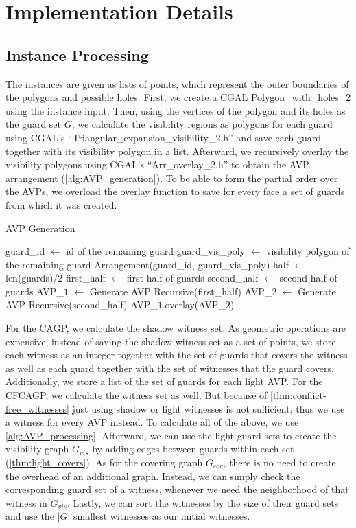 \chapter{Implementation Details}

\section{Instance Processing}
The instances are given as lists of points, which represent the outer boundaries of the polygons and possible holes. First, we create a CGAL Polygon\_with\_holes\_2 using the instance input. Then, using the vertices of the polygon and its holes as the guard set $G$, we calculate the visibility regions as polygons for each guard using CGAL's ``Triangular\_expansion\_visibility\_2.h'' and save each guard together with its visibility polygon in a list. Afterward, we recursively overlay the visibility polygons using CGAL's ``Arr\_overlay\_2.h'' to obtain the AVP arrangement (\cref{alg:AVP_generation}). To be able to form the partial order over the AVPs, we overload the overlay function to save for every face a set of guards from which it was created. 

\begin{algorithm}
\caption{AVP Generation}\label{alg:AVP_generation}
\begin{algorithmic} 
    \State guard\_id $\gets$ id of the remaining guard
    \State guard\_vis\_poly $\gets$ visibility polygon of the remaining guard
    \State \Return Arrangement(guard\_id, guard\_vis\_poly)
\Else
    \State half $\gets$ len(guards)/$2$
    \State first\_half $\gets$ first half of guards
    \State second\_half $\gets$ second half of guards
    \State AVP\_$1$ $\gets$ Generate AVP Recursive(first\_half)
    \State AVP\_$2$ $\gets$ Generate AVP Recursive(second\_half)
    \State \Return AVP\_$1$.overlay(AVP\_$2$)
\EndIf
\EndProcedure
\end{algorithmic}
\end{algorithm}

For the CAGP, we calculate the shadow witness set. As geometric operations are expensive, instead of saving the shadow witness set as a set of points, we store each witness as an integer together with the set of guards that covers the witness as well as each guard together with the set of witnesses that the guard covers. Additionally, we store a list of the set of guards for each light AVP. For the CFCAGP, we calculate the witness set as well. But because of \cref{thm:conflict-free_witnesses} just using shadow or light witnesses is not sufficient, thus we use a witness for every AVP instead. To calculate all of the above, we use \cref{alg:AVP_processing}. Afterward, we can use the light guard sets to create the visibility graph $G_{vis}$ by adding edges between guards within each set (\cref{thm:light_covers}). As for the covering graph $G_{cov}$, there is no need to create the overhead of an additional graph. Instead, we can simply check the corresponding guard set of a witness, whenever we need the neighborhood of that witness in $G_{vis}$. Lastly, we can sort the witnesses by the size of their guard sets and use the $|G|$ smallest witnesses as our initial witnesses.

